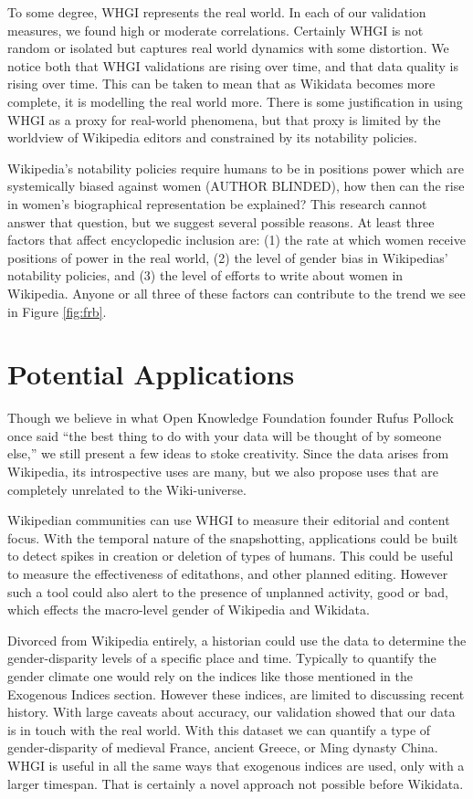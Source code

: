 \documentclass[letterpaper]{article}
\begin{document}
To some degree, WHGI represents the real world. In each of our validation measures, we found high or moderate correlations. Certainly WHGI is not random or isolated but captures real world dynamics with some distortion. We notice both that WHGI validations are rising over time, and that data quality is rising over time. This can be taken to mean that as Wikidata becomes more complete, it is modelling the real world more. There is some justification in using WHGI as a proxy for real-world phenomena, but that proxy is limited by the worldview of Wikipedia editors and constrained by its notability policies.

Wikipedia's notability policies require humans to be in positions power which are systemically biased against women (AUTHOR BLINDED), how then can the rise in women's biographical representation be explained? This research cannot answer that question, but we suggest several possible reasons. At least three factors that affect encyclopedic inclusion are: (1) the rate at which women receive positions of power in the real world, (2) the level of gender bias in Wikipedias' notability policies, and (3) the level of efforts to write about women in Wikipedia. Anyone or all three of these factors can contribute to the trend we see in Figure \ref{fig:frb}.

\section{Potential Applications}
Though we believe in what Open Knowledge Foundation founder Rufus Pollock once said ``the best thing to do with your data will be thought of by someone else,'' we still present a few ideas to stoke creativity. Since the data arises from Wikipedia, its introspective uses are many, but we also propose uses that are completely unrelated to the Wiki-universe.

Wikipedian communities can use WHGI to measure their editorial and content focus. With the temporal nature of the snapshotting, applications could be built to detect spikes in creation or deletion of types of humans. This could be useful to measure the effectiveness of editathons, and other planned editing. However such a tool could also alert to the presence of unplanned activity, good or bad, which effects the macro-level gender of Wikipedia and Wikidata.

Divorced from Wikipedia entirely, a historian could use the data to determine the gender-disparity levels of a specific place and time. Typically to quantify the gender climate one would rely on the indices like those mentioned in the Exogenous Indices section. However these indices, are limited to discussing recent history. With large caveats about accuracy, our validation showed that our data is in touch with the real world. With this dataset we can quantify a type of gender-disparity of medieval France, ancient Greece, or Ming dynasty China. WHGI is useful in all the same ways that exogenous indices are used, only with a larger timespan. That is certainly a novel approach not possible before Wikidata.
\end{document}
